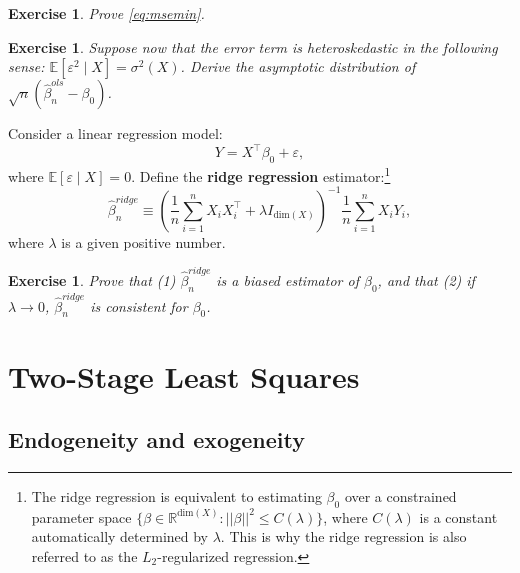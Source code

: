 \documentclass[10.5pt, A4paper, openany, uplatex]{book}
\newcommand{\eps}{\varepsilon}
\newcommand{\E}{\mathbb{E}}
\renewcommand{\hat}{\widehat}
\newtheorem{exercise}[theorem]{Exercise}
\numberwithin{equation}{section}
\begin{document}
\begin{framed}
\begin{exercise}\upshape
	Prove \eqref{eq:msemin}.
\end{exercise}
\begin{exercise}\upshape
	Suppose now that the error term is heteroskedastic in the following sense: $\E[\eps^2 \mid X] = \sigma^2(X)$.
	Derive the asymptotic distribution of $\sqrt{n}(\hat \beta_n^{ols} - \beta_0)$.
\end{exercise}
\end{framed}
Consider a linear regression model:
\[
Y = X^\top \beta_0 + \eps,
\]
where $\E[\eps \mid X] = 0$.
Define the \textbf{ridge regression} estimator:\footnote{
	The ridge regression is equivalent to estimating $\beta_0$ over a constrained parameter space $\{\beta\in\mathbb{R}^{\text{dim}(X)} : ||\beta||^2 \le C(\lambda)\}$, where $C(\lambda)$ is a constant automatically determined by $\lambda$. 
	This is why the ridge regression is also referred to as the $L_2$-regularized regression.
	}
\[
\hat \beta_n^{ridge} \equiv \left(\frac{1}{n}\sum_{i = 1}^n X_i X_i^\top + \lambda I_{\text{dim}(X)} \right)^{-1}\frac{1}{n}\sum_{i = 1}^n X_i Y_i,
\]
where $\lambda$ is a given positive number.
\begin{framed}
\begin{exercise}\upshape
	Prove that (1) $\hat \beta_n^{ridge}$ is a biased estimator of $\beta_0$, and that (2) if $\lambda \to 0$, $\hat \beta_n^{ridge}$ is consistent for $\beta_0$.
\end{exercise}
\end{framed}


\chapter{Two-Stage Least Squares}\label{chap:2sls}
\section{Endogeneity and exogeneity}
\end{document}
